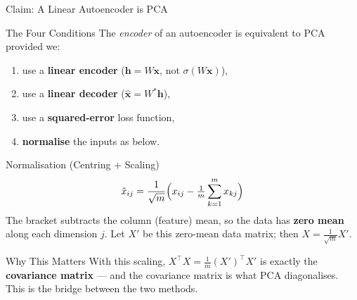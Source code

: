 \documentclass{beamer}
\begin{document}
\begin{frame}[shrink=10]{Claim: A Linear Autoencoder is PCA}
  \begin{block}{The Four Conditions}
    The \emph{encoder} of an autoencoder is equivalent to PCA provided we:
    \begin{enumerate}\setlength\itemsep{3pt}
      \item use a \textbf{linear encoder} ($\mathbf{h}=W\mathbf{x}$, not $\sigma(W\mathbf{x})$),
      \item use a \textbf{linear decoder} ($\hat{\mathbf{x}}=W^{*}\mathbf{h}$),
      \item use a \textbf{squared-error} loss function,
      \item \textbf{normalise} the inputs as below.
    \end{enumerate}
  \end{block}

  \begin{block}{Normalisation (Centring + Scaling)}
    \[
      \hat{x}_{ij}
        = \frac{1}{\sqrt{m}}
          \Bigl(x_{ij} - \tfrac{1}{m}\sum_{k=1}^{m}x_{kj}\Bigr)
    \]
    The bracket subtracts the column (feature) mean, so the data has
    \textbf{zero mean} along each dimension $j$. Let $X'$ be this
    zero-mean data matrix; then $X = \tfrac{1}{\sqrt{m}}X'$.
  \end{block}

  \begin{exampleblock}{Why This Matters}
    With this scaling, $X^{\top}X = \frac{1}{m}(X')^{\top}X'$ is exactly the
    \textbf{covariance matrix} --- and the covariance matrix is what PCA
    diagonalises. This is the bridge between the two methods.
  \end{exampleblock}
\end{frame}
\end{document}
